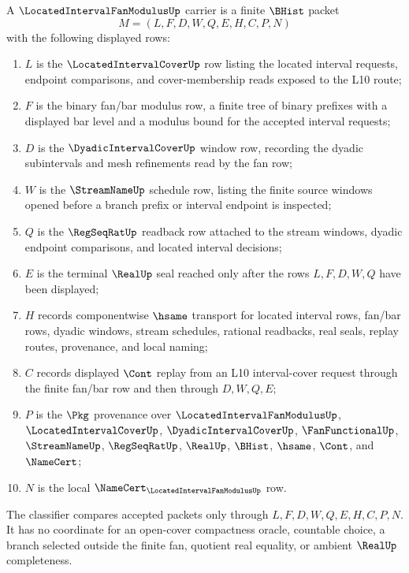 \begin{definition}
\label{def:located-interval-fan-modulus-carrier}
A $\LocatedIntervalFanModulusUp$ carrier is a finite $\BHist$ packet
$$
M=(L,F,D,W,Q,E,H,C,P,N)
$$
with the following displayed rows:
\begin{enumerate}
\item $L$ is the $\LocatedIntervalCoverUp$ row listing the located interval requests, endpoint comparisons, and cover-membership reads exposed to the L10 route;
\item $F$ is the binary fan/bar modulus row, a finite tree of binary prefixes with a displayed bar level and a modulus bound for the accepted interval requests;
\item $D$ is the $\DyadicIntervalCoverUp$ window row, recording the dyadic subintervals and mesh refinements read by the fan row;
\item $W$ is the $\StreamNameUp$ schedule row, listing the finite source windows opened before a branch prefix or interval endpoint is inspected;
\item $Q$ is the $\RegSeqRatUp$ readback row attached to the stream windows, dyadic endpoint comparisons, and located interval decisions;
\item $E$ is the terminal $\RealUp$ seal reached only after the rows $L,F,D,W,Q$ have been displayed;
\item $H$ records componentwise $\hsame$ transport for located interval rows, fan/bar rows, dyadic windows, stream schedules, rational readbacks, real seals, replay routes, provenance, and local naming;
\item $C$ records displayed $\Cont$ replay from an L10 interval-cover request through the finite fan/bar row and then through $D,W,Q,E$;
\item $P$ is the $\Pkg$ provenance over $\LocatedIntervalFanModulusUp$, $\LocatedIntervalCoverUp$, $\DyadicIntervalCoverUp$, $\FanFunctionalUp$, $\StreamNameUp$, $\RegSeqRatUp$, $\RealUp$, $\BHist$, $\hsame$, $\Cont$, and $\NameCert$;
\item $N$ is the local $\NameCert_{\LocatedIntervalFanModulusUp}$ row.
\end{enumerate}
The classifier compares accepted packets only through $L,F,D,W,Q,E,H,C,P,N$. It has no coordinate for an open-cover compactness oracle, countable choice, a branch selected outside the finite fan, quotient real equality, or ambient $\RealUp$ completeness.
\end{definition}

